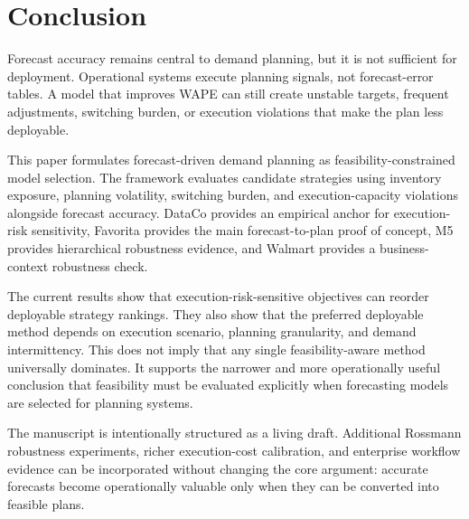 \section{Conclusion}

Forecast accuracy remains central to demand planning, but it is not sufficient for deployment. Operational systems execute planning signals, not forecast-error tables. A model that improves WAPE can still create unstable targets, frequent adjustments, switching burden, or execution violations that make the plan less deployable.

This paper formulates forecast-driven demand planning as feasibility-constrained model selection. The framework evaluates candidate strategies using inventory exposure, planning volatility, switching burden, and execution-capacity violations alongside forecast accuracy. DataCo provides an empirical anchor for execution-risk sensitivity, Favorita provides the main forecast-to-plan proof of concept, M5 provides hierarchical robustness evidence, and Walmart provides a business-context robustness check.

The current results show that execution-risk-sensitive objectives can reorder deployable strategy rankings. They also show that the preferred deployable method depends on execution scenario, planning granularity, and demand intermittency. This does not imply that any single feasibility-aware method universally dominates. It supports the narrower and more operationally useful conclusion that feasibility must be evaluated explicitly when forecasting models are selected for planning systems.

The manuscript is intentionally structured as a living draft. Additional Rossmann robustness experiments, richer execution-cost calibration, and enterprise workflow evidence can be incorporated without changing the core argument: accurate forecasts become operationally valuable only when they can be converted into feasible plans.
